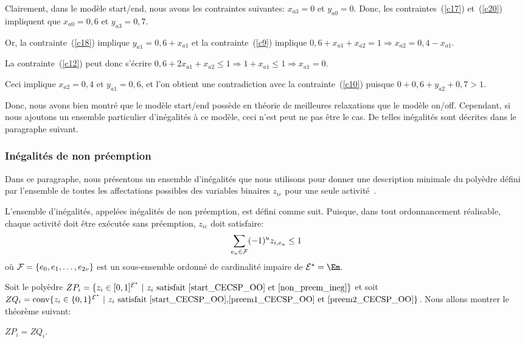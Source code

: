 Clairement, dans le modèle start/end, nous avons les contraintes
suivantes: $x_{a3}=0$ et $y_{a0}=0$. Donc, les contraintes~(\ref{c17})
et~(\ref{c20}) impliquent que $x_{a0}=0,6$ et $y_{a3}=0,7$. 

Or, la contrainte~(\ref{c18}) implique $y_{a1}=0,6+x_{a1}$
et la contrainte~(\ref{c9}) implique $0,6+x_{a1}+x_{a2}=1 \Rightarrow
x_{a2}=0,4-x_{a1}$. 

La contrainte~(\ref{c12}) peut donc s'écrire
$0,6+2x_{a1}+x_{a2}\le 1 \Rightarrow 1+x_{a1}\le 1 \Rightarrow
x_{a1}=0$. 

Ceci implique $x_{a2}=0,4$ et $y_{a1}=0,6$, et l'on obtient
une contradiction avec la contrainte~(\ref{c10}) puisque $0+0,6+y_{a2}+0,7>1$.

Donc, nous avons bien montré que le modèle start/end possède en
théorie de meilleures relaxations que le modèle on/off. Cependant, si
nous ajoutons un ensemble particulier d'inégalités à ce modèle, ceci
n'est peut ne pas être le cas. De telles inégalités sont décrites dans
le paragraphe suivant.


\subsubsection{Inégalités de non préemption}
\label{sec:nonPreem}

Dans ce paragraphe, nous présentons un ensemble d'inégalités que nous
utilisons pour donner une description minimale du polyèdre défini par
l'ensemble de toutes les affectations possibles des variables binaires
$z_{ie}$ pour une seule activité~\cite{LAASreport}. 

L'ensemble d'inégalités, appelées inégalités de non préemption, est
défini comme suit. Puisque, dans tout ordonnancement réalisable,
chaque activité doit être exécutée sans préemption, $z_{ie}$ doit
satisfaire:
\begin{equation}
  \sum_{e_u \in {\cal F}} (-1)^{u} z_{i,e_u} \le 1
\label{non_preem_ineg}
\end{equation}
où ${\cal F}=\{e_0,e_1,\dots,e_{2v}\}$ est un sous-ensemble ordonné de
cardinalité impaire de $\E^*=\Em$.  

Soit le polyèdre $ZP_i=\{z_i \in [0,1]^{{\cal E}^*}\ | \ z_i\text{ satisfait
\eqref{start_CECSP_OO} et \eqref{non_preem_ineg}}\}$ et soit
$ZQ_i=\mathrm{conv}\{z_i \in \{0,1\}^{{\cal E}^*}\ | \ z_i\text{ satisfait
\eqref{start_CECSP_OO},\eqref{preem1_CECSP_OO} et
\eqref{preem2_CECSP_OO}}\}$. Nous allons montrer le théorème suivant: 

\begin{theo}
$ZP_i=ZQ_i$.
\end{theo}


